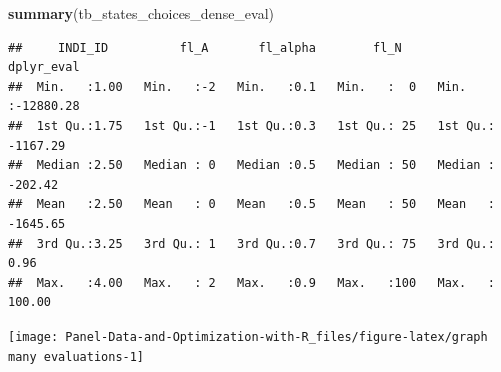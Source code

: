 \documentclass[
]{book}
\newenvironment{Shaded}{\begin{snugshade}}{\end{snugshade}}
\newcommand{\DataTypeTok}[1]{\textcolor[rgb]{0.13,0.29,0.53}{#1}}
\newcommand{\DecValTok}[1]{\textcolor[rgb]{0.00,0.00,0.81}{#1}}
\newcommand{\KeywordTok}[1]{\textcolor[rgb]{0.13,0.29,0.53}{\textbf{#1}}}
\newcommand{\NormalTok}[1]{#1}
\newcommand{\OperatorTok}[1]{\textcolor[rgb]{0.81,0.36,0.00}{\textbf{#1}}}
\newcommand{\StringTok}[1]{\textcolor[rgb]{0.31,0.60,0.02}{#1}}
\begin{document}
\begin{Shaded}
\begin{Highlighting}[]
\KeywordTok{summary}\NormalTok{(tb_states_choices_dense_eval)}
\end{Highlighting}
\end{Shaded}

\begin{verbatim}
##     INDI_ID          fl_A       fl_alpha        fl_N       dplyr_eval       
##  Min.   :1.00   Min.   :-2   Min.   :0.1   Min.   :  0   Min.   :-12880.28  
##  1st Qu.:1.75   1st Qu.:-1   1st Qu.:0.3   1st Qu.: 25   1st Qu.: -1167.29  
##  Median :2.50   Median : 0   Median :0.5   Median : 50   Median :  -202.42  
##  Mean   :2.50   Mean   : 0   Mean   :0.5   Mean   : 50   Mean   : -1645.65  
##  3rd Qu.:3.25   3rd Qu.: 1   3rd Qu.:0.7   3rd Qu.: 75   3rd Qu.:     0.96  
##  Max.   :4.00   Max.   : 2   Max.   :0.9   Max.   :100   Max.   :   100.00
\end{verbatim}

\begin{Shaded}
\end{Shaded}

\begin{center}\texttt{[image: Panel-Data-and-Optimization-with-R\_files/figure-latex/graph many evaluations-1]} \end{center}
\end{document}
